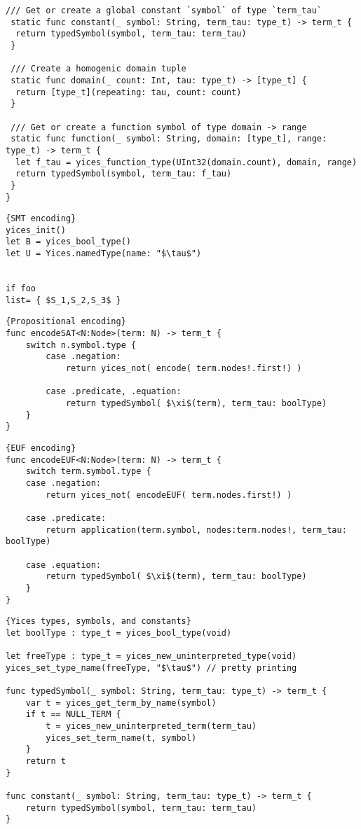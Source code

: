 \begin{lstlisting}[language=FLEA] 
 /// Get or create a global constant `symbol` of type `term_tau`
 static func constant(_ symbol: String, term_tau: type_t) -> term_t {
  return typedSymbol(symbol, term_tau: term_tau)
 }
 
 /// Create a homogenic domain tuple
 static func domain(_ count: Int, tau: type_t) -> [type_t] {
  return [type_t](repeating: tau, count: count)
 }
 
 /// Get or create a function symbol of type domain -> range
 static func function(_ symbol: String, domain: [type_t], range: type_t) -> term_t {
  let f_tau = yices_function_type(UInt32(domain.count), domain, range)
  return typedSymbol(symbol, term_tau: f_tau)
 }
}
\end{lstlisting}

\begin{lstlisting}[language=FLEA, mathescape=true]{SMT encoding}
yices_init()
let B = yices_bool_type()
let U = Yices.namedType(name: "$\tau$")


if foo
list= { $S_1,S_2,S_3$ }
\end{lstlisting}

\begin{lstlisting}[language=FLEA]{Propositional encoding}
func encodeSAT<N:Node>(term: N) -> term_t {
	switch n.symbol.type {
		case .negation:
			return yices_not( encode( term.nodes!.first!) )
		
		case .predicate, .equation:
			return typedSymbol( $\xi$(term), term_tau: boolType)
	}	
}
\end{lstlisting}

\begin{lstlisting}[language=FLEA]{EUF encoding}
func encodeEUF<N:Node>(term: N) -> term_t {
	switch term.symbol.type {
	case .negation:
		return yices_not( encodeEUF( term.nodes.first!) )

	case .predicate:
		return application(term.symbol, nodes:term.nodes!, term_tau: boolType)
		
	case .equation:
		return typedSymbol( $\xi$(term), term_tau: boolType)
	}	
}
\end{lstlisting}


\begin{lstlisting}[language=flea]{Yices types, symbols, and constants}
let boolType : type_t = yices_bool_type(void)

let freeType : type_t = yices_new_uninterpreted_type(void)
yices_set_type_name(freeType, "$\tau$") // pretty printing

func typedSymbol(_ symbol: String, term_tau: type_t) -> term_t {
	var t = yices_get_term_by_name(symbol)
	if t == NULL_TERM {
		t = yices_new_uninterpreted_term(term_tau)
		yices_set_term_name(t, symbol)
	}
	return t
}

func constant(_ symbol: String, term_tau: type_t) -> term_t {
	return typedSymbol(symbol, term_tau: term_tau)
}
\end{lstlisting}




